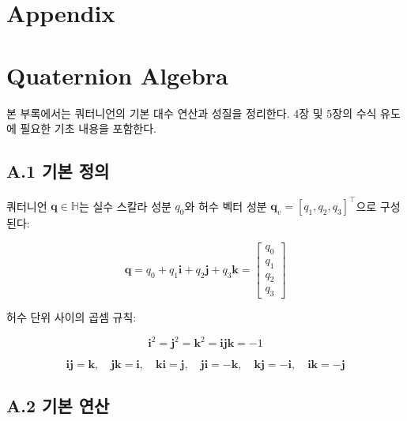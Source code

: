 \section*{Appendix}

\appendix

\section{Quaternion Algebra}
    \label{app:quaternion}

    본 부록에서는 쿼터니언의 기본 대수 연산과 성질을 정리한다. 4장 및 5장의 수식 유도에 필요한 기초 내용을 포함한다.\\

    \subsection*{A.1 기본 정의}
        쿼터니언 $\mathbf{q} \in \mathbb{H}$는 실수 스칼라 성분 $q_0$와 허수 벡터 성분 $\mathbf{q}_v = [q_1, q_2, q_3]^\top$으로 구성된다:
 
        \begin{equation}
            \mathbf{q} = q_0 + q_1\mathbf{i} + q_2\mathbf{j} + q_3\mathbf{k} =
            \begin{bmatrix} q_0 \\ q_1 \\ q_2 \\ q_3 \end{bmatrix}
            \tag{A.1}
        \end{equation}
        
        허수 단위 사이의 곱셈 규칙:
        
        \begin{equation}
            \mathbf{i}^2 = \mathbf{j}^2 = \mathbf{k}^2 = \mathbf{ijk} = -1
            \tag{A.2}
        \end{equation}
        
        \begin{equation}
            \mathbf{ij} = \mathbf{k},\quad \mathbf{jk} = \mathbf{i},\quad \mathbf{ki} = \mathbf{j},\quad
            \mathbf{ji} = -\mathbf{k},\quad \mathbf{kj} = -\mathbf{i},\quad \mathbf{ik} = -\mathbf{j}
            \tag{A.3}
        \end{equation}
 
    \subsection*{A.2 기본 연산}
